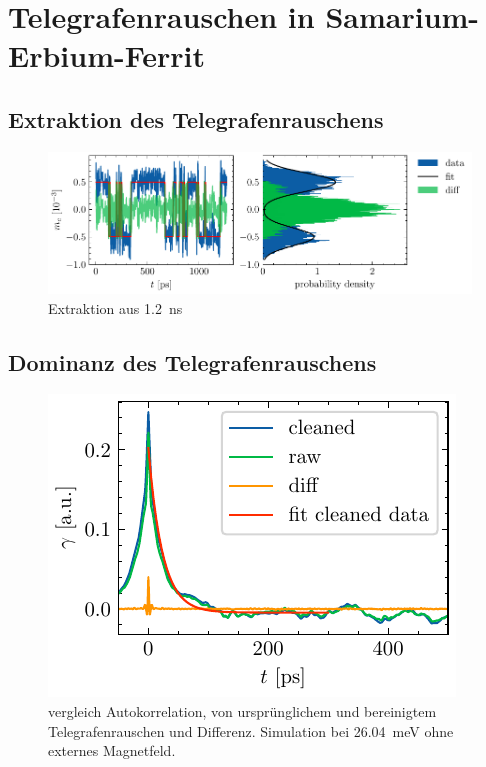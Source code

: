 \documentclass[main.tex]{subfiles}
\begin{document}
\newpage
\section{Telegrafenrauschen in Samarium-Erbium-Ferrit}


\subsection{Extraktion des Telegrafenrauschens}

\begin{figure}[h]
    \centering
    \includegraphics{bilder/plots/Bz_0mT/mc_fit_hist_part2_26.03meV.pdf}
    \caption{Extraktion aus \SI{1,2}{\nano\s}}\label{fig:Extraktion-ausschnitt}
\end{figure}



\subsection*{Dominanz des Telegrafenrauschens}

\begin{figure}[h]
    \centering
    \includegraphics{bilder/plots/Bz_0mT/autocorr_26.03meV.pdf}
    \caption{vergleich Autokorrelation, von ursprünglichem und bereinigtem Telegrafenrauschen und Differenz. Simulation bei \SI{26.04}{\milli\electronvolt} ohne externes Magnetfeld.}\label{fig:autocorr}
\end{figure}
\end{document}
